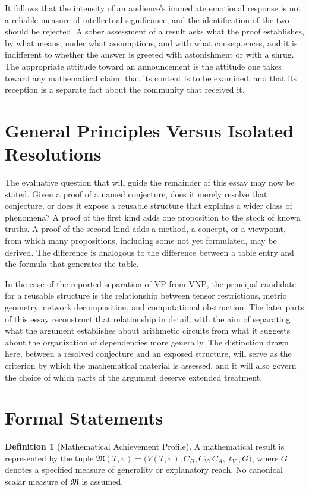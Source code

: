 \documentclass[11pt,letterpaper]{report}
\theoremstyle{plain}
\theoremstyle{definition}
\newtheorem{definition}[theorem]{Definition}
\theoremstyle{remark}
\newcommand{\VP}{\mathrm{VP}}
\newcommand{\VNP}{\mathrm{VNP}}
\begin{document}
It follows that the intensity of an audience's immediate emotional response is not a reliable measure of intellectual significance, and the identification of the two should be rejected. A sober assessment of a result asks what the proof establishes, by what means, under what assumptions, and with what consequences, and it is indifferent to whether the answer is greeted with astonishment or with a shrug. The appropriate attitude toward an announcement is the attitude one takes toward any mathematical claim: that its content is to be examined, and that its reception is a separate fact about the community that received it.

\section{General Principles Versus Isolated Resolutions}

The evaluative question that will guide the remainder of this essay may now be stated. Given a proof of a named conjecture, does it merely resolve that conjecture, or does it expose a reusable structure that explains a wider class of phenomena? A proof of the first kind adds one proposition to the stock of known truths. A proof of the second kind adds a method, a concept, or a viewpoint, from which many propositions, including some not yet formulated, may be derived. The difference is analogous to the difference between a table entry and the formula that generates the table.

In the case of the reported separation of $\VP$ from $\VNP$, the principal candidate for a reusable structure is the relationship between tensor restrictions, metric geometry, network decomposition, and computational obstruction. The later parts of this essay reconstruct that relationship in detail, with the aim of separating what the argument establishes about arithmetic circuits from what it suggests about the organization of dependencies more generally. The distinction drawn here, between a resolved conjecture and an exposed structure, will serve as the criterion by which the mathematical material is assessed, and it will also govern the choice of which parts of the argument deserve extended treatment.

\section{Formal Statements}

\begin{definition}[Mathematical Achievement Profile]
A mathematical result is represented by the tuple $\mathfrak M(T,\pi)=\bigl(V(T,\pi),C_D,C_V,C_A,\ell_V,G\bigr)$, where $G$ denotes a specified measure of generality or explanatory reach. No canonical scalar measure of $\mathfrak M$ is assumed.
\end{definition}
\end{document}
